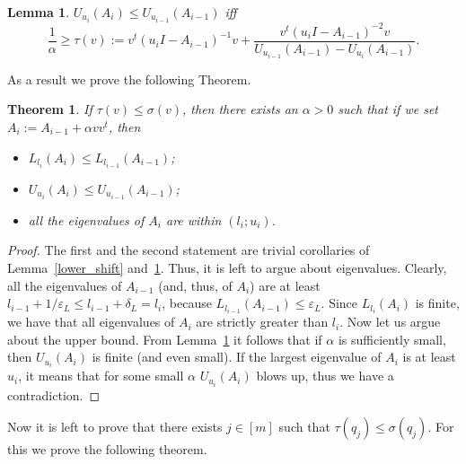 \documentclass[12pt]{article}
\newcommand{\eps}{\varepsilon}
\newtheorem{theorem}{Theorem}
\newtheorem{lemma}{Lemma}
\begin{document}
    \begin{lemma}
        \label{upper_shift}
        $U_{u_i}(A_i) \leq U_{u_{i-1}}(A_{i-1})$ iff
        $$
            \frac{1}{\alpha} \geq \tau(v) := v^t(u_iI - A_{i-1})^{-1}v +
            \frac{v^t(u_iI - A_{i-1})^{-2}v}{U_{u_{i-1}}(A_{i-1}) - U_{u_i}(A_{i-1})}.
        $$
    \end{lemma}

    As a result we prove the following Theorem.
    \begin{theorem}
        If $\tau(v) \leq \sigma(v)$, then there exists an $\alpha > 0$ such that if we set $A_i := A_{i-1} + \alpha vv^t$,
        then
        \begin{itemize}
            \item $L_{l_i}(A_i) \leq L_{l_{i-1}}(A_{i-1})$;
            \item $U_{u_i}(A_i) \leq U_{u_{i-1}}(A_{i-1})$;
            \item all the eigenvalues of $A_i$ are within $(l_i; u_i)$.
        \end{itemize}
    \end{theorem}
    \begin{proof}
        The first and the second statement are trivial corollaries of Lemma~\ref{lower_shift} and~\ref{upper_shift}.
        Thus, it is left to argue about eigenvalues.
        Clearly, all the eigenvalues of $A_{i-1}$ (and, thus, of $A_i$) are at least
        $l_{i-1} + 1 / \eps_L \leq l_{i-1} + \delta_L = l_i$, because $L_{l_{i-1}}(A_{i-1}) \leq \eps_L$.
        Since $L_{l_i}(A_i)$ is finite, we have that all eigenvalues of $A_i$ are strictly greater than $l_i$.
        Now let us argue about the upper bound. From Lemma~\ref{upper_shift} it follows that if $\alpha$ is sufficiently
        small, then $U_{u_i}(A_i)$ is finite (and even small). If the largest eigenvalue of $A_i$ is at least $u_i$,
        it means that for some small $\alpha$ $U_{u_i}(A_i)$ blows up, thus we have a contradiction.
    \end{proof}

    Now it is left to prove that there exists $j \in [m]$ such that $\tau(q_j) \leq \sigma(q_j)$.
    For this we prove the following theorem.
\end{document}
